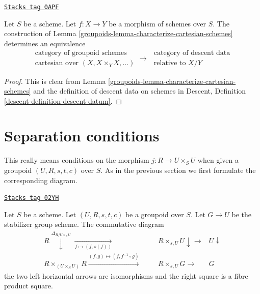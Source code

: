 \begin{lemma}
\label{groupoids-lemma-cartesian-equivalent-descent-datum}
\href{https://stacks.math.columbia.edu/tag/0APF}{\texttt{Stacks tag 0APF}}

Let $S$ be a scheme. Let $f : X \to Y$ be a morphism of schemes over $S$.
The construction of Lemma \ref{groupoids-lemma-characterize-cartesian-schemes}
determines an equivalence
$$
\begin{matrix}
\text{category of groupoid schemes} \\
\text{cartesian over } (X, X \times_Y X, \ldots)
\end{matrix}
\longrightarrow
\begin{matrix}
\text{ category of descent data} \\
\text{ relative to } X/Y
\end{matrix}
$$
\end{lemma}

\begin{proof}

This is clear from
Lemma \ref{groupoids-lemma-characterize-cartesian-schemes}
and the definition of descent data on schemes in
Descent, Definition \ref{descent-definition-descent-datum}.
\end{proof}

\section{Separation conditions}
\label{groupoids-section-separation}
This really means conditions on the morphism $j : R \to U \times_S U$
when given a groupoid $(U, R, s, t, c)$ over $S$. As in the previous
section we first formulate the corresponding diagram.

\begin{lemma}
\label{groupoids-lemma-diagram-diagonal}
\href{https://stacks.math.columbia.edu/tag/02YH}{\texttt{Stacks tag 02YH}}

Let $S$ be a scheme.
Let $(U, R, s, t, c)$ be a groupoid over $S$.
Let $G \to U$ be the stabilizer group scheme.
The commutative diagram
$$
\begin{array}{ccccc}R \overset{\Delta_{R/U \times_S U}}{\downarrow}\underset{f \mapsto (f, s(f))}{\longrightarrow} &  &  & R \times_{s, U} U \downarrow\longrightarrow & U \downarrow \\ R \times_{(U \times_S U)} R \overset{(f, g) \mapsto (f, f^{-1} \circ g)}{\longrightarrow} &  &  & R \times_{s, U} G \longrightarrow & G\end{array}
$$
the two left horizontal arrows are isomorphisms
and the right square is a fibre product square.
\end{lemma}

